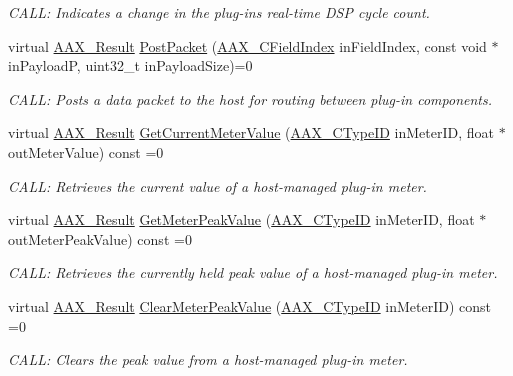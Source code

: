 \begin{DoxyCompactItemize}
\begin{DoxyCompactList}\small\item\em C\+A\+LL\+: Indicates a change in the plug-\/in\textquotesingle{}s real-\/time D\+SP cycle count. \end{DoxyCompactList}\item 
virtual \mbox{\hyperlink{a00392_a4d8f69a697df7f70c3a8e9b8ee130d2f}{A\+A\+X\+\_\+\+Result}} \mbox{\hyperlink{a01637_a5bb3178980788c00cc2fe17729b5bf7b}{Post\+Packet}} (\mbox{\hyperlink{a00392_ae807f8986143820cfb5d6da32165c9c7}{A\+A\+X\+\_\+\+C\+Field\+Index}} in\+Field\+Index, const void $\ast$in\+PayloadP, uint32\+\_\+t in\+Payload\+Size)=0
\begin{DoxyCompactList}\small\item\em C\+A\+LL\+: Posts a data packet to the host for routing between plug-\/in components. \end{DoxyCompactList}\item 
virtual \mbox{\hyperlink{a00392_a4d8f69a697df7f70c3a8e9b8ee130d2f}{A\+A\+X\+\_\+\+Result}} \mbox{\hyperlink{a01637_a2010fae8eb08f24156ae2fc4a3698c9a}{Get\+Current\+Meter\+Value}} (\mbox{\hyperlink{a00392_ac678f9c1fbcc26315d209f71a147a175}{A\+A\+X\+\_\+\+C\+Type\+ID}} in\+Meter\+ID, float $\ast$out\+Meter\+Value) const =0
\begin{DoxyCompactList}\small\item\em C\+A\+LL\+: Retrieves the current value of a host-\/managed plug-\/in meter. \end{DoxyCompactList}\item 
virtual \mbox{\hyperlink{a00392_a4d8f69a697df7f70c3a8e9b8ee130d2f}{A\+A\+X\+\_\+\+Result}} \mbox{\hyperlink{a01637_aec42969d56720ac54290250bc45f89fb}{Get\+Meter\+Peak\+Value}} (\mbox{\hyperlink{a00392_ac678f9c1fbcc26315d209f71a147a175}{A\+A\+X\+\_\+\+C\+Type\+ID}} in\+Meter\+ID, float $\ast$out\+Meter\+Peak\+Value) const =0
\begin{DoxyCompactList}\small\item\em C\+A\+LL\+: Retrieves the currently held peak value of a host-\/managed plug-\/in meter. \end{DoxyCompactList}\item 
virtual \mbox{\hyperlink{a00392_a4d8f69a697df7f70c3a8e9b8ee130d2f}{A\+A\+X\+\_\+\+Result}} \mbox{\hyperlink{a01637_ae2bc5026d16796a8cb4294f1805302bc}{Clear\+Meter\+Peak\+Value}} (\mbox{\hyperlink{a00392_ac678f9c1fbcc26315d209f71a147a175}{A\+A\+X\+\_\+\+C\+Type\+ID}} in\+Meter\+ID) const =0
\begin{DoxyCompactList}\small\item\em C\+A\+LL\+: Clears the peak value from a host-\/managed plug-\/in meter. \end{DoxyCompactList}\item 

\end{DoxyCompactItemize}
